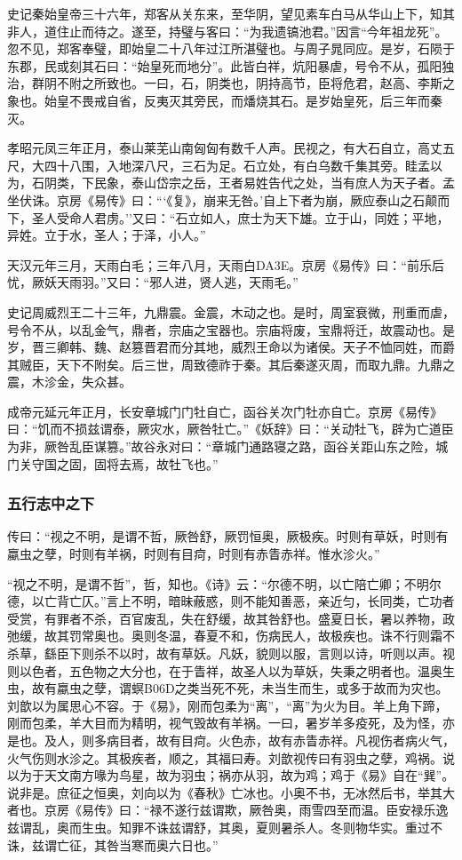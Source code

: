 \documentclass[]{article}
\begin{document}
史记秦始皇帝三十六年，郑客从关东来，至华阴，望见素车白马从华山上下，知其非人，道住止而待之。遂至，持璧与客曰：``为我遗镐池君。''因言``今年祖龙死''。忽不见，郑客奉璧，即始皇二十八年过江所湛璧也。与周子晁同应。是岁，石陨于东郡，民或刻其石曰：``始皇死而地分''。此皆白祥，炕阳暴虐，号令不从，孤阳独治，群阴不附之所致也。一曰，石，阴类也，阴持高节，臣将危君，赵高、李斯之象也。始皇不畏戒自省，反夷灭其旁民，而燔烧其石。是岁始皇死，后三年而秦灭。

孝昭元凤三年正月，泰山莱芜山南匈匈有数千人声。民视之，有大石自立，高丈五尺，大四十八围，入地深八尺，三石为足。石立处，有白乌数千集其旁。眭孟以为，石阴类，下民象，泰山岱宗之岳，王者易姓告代之处，当有庶人为天子者。孟坐伏诛。京房《易传》曰：```《复》，崩来无咎。'自上下者为崩，厥应泰山之石颠而下，圣人受命人君虏。''又曰：``石立如人，庶士为天下雄。立于山，同姓；平地，异姓。立于水，圣人；于泽，小人。''

天汉元年三月，天雨白毛；三年八月，天雨白DA3E。京房《易传》曰：``前乐后忧，厥妖天雨羽。''又曰：``邪人进，贤人逃，天雨毛。''

史记周威烈王二十三年，九鼎震。金震，木动之也。是时，周室衰微，刑重而虐，号令不从，以乱金气，鼎者，宗庙之宝器也。宗庙将废，宝鼎将迁，故震动也。是岁，晋三卿韩、魏、赵篡晋君而分其地，威烈王命以为诸侯。天子不恤同姓，而爵其贼臣，天下不附矣。后三世，周致德祚于秦。其后秦遂灭周，而取九鼎。九鼎之震，木沴金，失众甚。

成帝元延元年正月，长安章城门门牡自亡，函谷关次门牡亦自亡。京房《易传》曰：``饥而不损兹谓泰，厥灾水，厥咎牡亡。''《妖辞》曰：``关动牡飞，辟为亡道臣为非，厥咎乱臣谋篡。''故谷永对曰：``章城门通路寝之路，函谷关距山东之险，城门关守国之固，固将去焉，故牡飞也。''

\hypertarget{header-n2246}{%
\subsubsection{五行志中之下}\label{header-n2246}}

传曰：``视之不明，是谓不哲，厥咎舒，厥罚恒奥，厥极疾。时则有草妖，时则有蠃虫之孽，时则有羊祸，时则有目疴，时则有赤眚赤祥。惟水沴火。''

``视之不明，是谓不哲''，哲，知也。《诗》云：``尔德不明，以亡陪亡卿；不明尔德，以亡背亡仄。''言上不明，暗昧蔽惑，则不能知善恶，亲近匀，长同类，亡功者受赏，有罪者不杀，百官废乱，失在舒缓，故其咎舒也。盛夏日长，暑以养物，政弛缓，故其罚常奥也。奥则冬温，春夏不和，伤病民人，故极疾也。诛不行则霜不杀草，繇臣下则杀不以时，故有草妖。凡妖，貌则以服，言则以诗，听则以声。视则以色者，五色物之大分也，在于眚祥，故圣人以为草妖，失秉之明者也。温奥生虫，故有蠃虫之孽，谓螟B06D之类当死不死，未当生而生，或多于故而为灾也。刘歆以为属思心不容。于《易》，刚而包柔为``离''，``离''为火为目。羊上角下蹄，刚而包柔，羊大目而为精明，视气毁故有羊祸。一曰，暑岁羊多疫死，及为怪，亦是也。及人，则多病目者，故有目疴。火色赤，故有赤眚赤祥。凡视伤者病火气，火气伤则水沴之。其极疾者，顺之，其福曰寿。刘歆视传曰有羽虫之孽，鸡祸。说以为于天文南方喙为鸟星，故为羽虫；祸亦从羽，故为鸡；鸡于《易》自在``巽''。说非是。庶征之恒奥，刘向以为《春秋》亡冰也。小奥不书，无冰然后书，举其大者也。京房《易传》曰：``禄不遂行兹谓欺，厥咎奥，雨雪四至而温。臣安禄乐逸兹谓乱，奥而生虫。知罪不诛兹谓舒，其奥，夏则暑杀人。冬则物华实。重过不诛，兹谓亡征，其咎当寒而奥六日也。''
\end{document}
